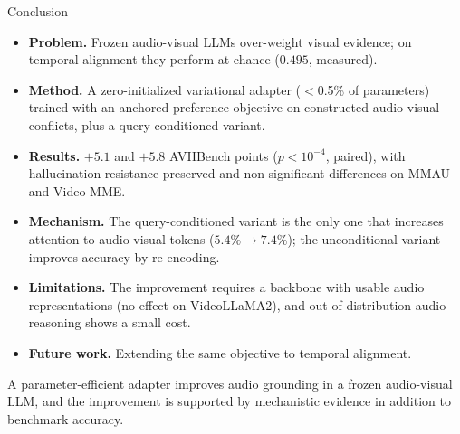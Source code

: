 \documentclass[aspectratio=169,11pt]{beamer}
\begin{document}
\begin{frame}{Conclusion}
\begin{itemize}
\item \textbf{Problem.} Frozen audio-visual LLMs over-weight visual evidence; on temporal
alignment they perform at chance ($0.495$, measured).
\item \textbf{Method.} A zero-initialized variational adapter ($<$0.5\% of parameters) trained with
an anchored preference objective on constructed audio-visual conflicts, plus a query-conditioned
variant.
\item \textbf{Results.} $+5.1$ and $+5.8$ AVHBench points ($p<10^{-4}$, paired), with hallucination
resistance preserved and non-significant differences on MMAU and Video-MME.
\item \textbf{Mechanism.} The query-conditioned variant is the only one that increases attention to
audio-visual tokens ($5.4\% \to 7.4\%$); the unconditional variant improves accuracy by re-encoding.
\item \textbf{Limitations.} The improvement requires a backbone with usable audio representations
(no effect on VideoLLaMA2), and out-of-distribution audio reasoning shows a small cost.
\item \textbf{Future work.} Extending the same objective to temporal alignment.
\end{itemize}
\vfill
\begin{center}
\begin{block}{}
\centering\footnotesize A parameter-efficient adapter improves audio grounding in a frozen audio-visual
LLM, and the improvement is supported by mechanistic evidence in addition to benchmark accuracy.
\end{block}
\end{center}
\end{frame}
\end{document}
